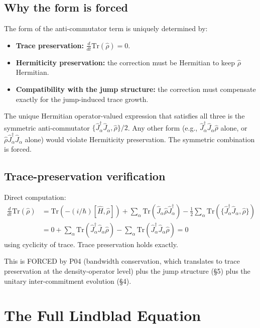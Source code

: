 \documentclass[11pt,a4paper]{article}
\begin{document}
\subsection{Why the form is forced}

The form of the anti-commutator term is uniquely determined by:

\begin{itemize}[noitemsep]
  \item \textbf{Trace preservation:} $\tfrac{d}{dt}\mathrm{Tr}(\hat\rho) = 0$.
  \item \textbf{Hermiticity preservation:} the correction must be Hermitian to keep $\hat\rho$ Hermitian.
  \item \textbf{Compatibility with the jump structure:} the correction must compensate exactly for the jump-induced trace growth.
\end{itemize}

The unique Hermitian operator-valued expression that satisfies all three is the symmetric anti-commutator $\{\hat J_\alpha^\dagger \hat J_\alpha, \hat\rho\}/2$. Any other form (e.g., $\hat J_\alpha^\dagger \hat J_\alpha \hat\rho$ alone, or $\hat\rho \hat J_\alpha^\dagger \hat J_\alpha$ alone) would violate Hermiticity preservation. The symmetric combination is forced.

\subsection{Trace-preservation verification}

Direct computation:
\begin{align*}
\frac{d}{dt}\mathrm{Tr}(\hat\rho) &= \mathrm{Tr}(-(i/\hbar)[\hat H, \hat\rho]) + \sum_\alpha\mathrm{Tr}(\hat J_\alpha\hat\rho\hat J_\alpha^\dagger) - \tfrac{1}{2}\sum_\alpha\mathrm{Tr}(\{\hat J_\alpha^\dagger\hat J_\alpha, \hat\rho\}) \\
&= 0 + \sum_\alpha\mathrm{Tr}(\hat J_\alpha^\dagger\hat J_\alpha\hat\rho) - \sum_\alpha\mathrm{Tr}(\hat J_\alpha^\dagger\hat J_\alpha\hat\rho) = 0
\end{align*}
using cyclicity of trace. Trace preservation holds exactly.

This is FORCED by P04 (bandwidth conservation, which translates to trace preservation at the density-operator level) plus the jump structure (\S5) plus the unitary inter-commitment evolution (\S4).

\section{The Full Lindblad Equation}
\end{document}
